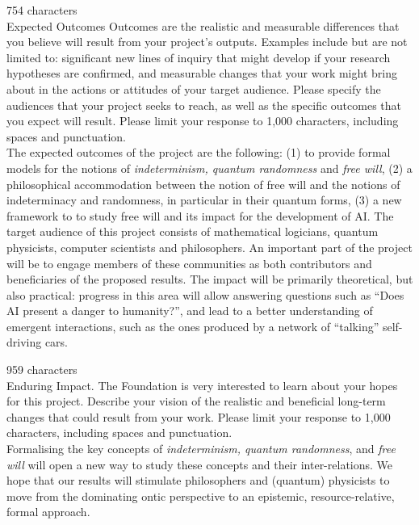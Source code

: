 \documentclass[11pt,  a4paper]{article}
\begin{document}
{\color{red}  754 characters}\\

{\small \color{blue}\noindent  Expected Outcomes Outcomes are the realistic and measurable differences that you believe will result from your project’s outputs. Examples include but are not limited to: significant new lines of inquiry that might develop if your research hypotheses are confirmed, and measurable changes that your work might bring about in the actions or attitudes of your target audience.
Please specify the audiences that your project seeks to reach, as well as the specific outcomes that you expect will result. Please limit your response to 1,000 characters, including spaces and punctuation.}\\


The expected outcomes of the project are the following: (1) to provide  formal models for the notions of {\it indeterminism, quantum randomness} and {\it free will},
(2) a philosophical accommodation
 between the notion of free will and the notions of indeterminacy and randomness, in particular in their quantum forms, (3) a new framework to to study free will and  its impact  for the development of AI. The target audience of this project consists of mathematical logicians, quantum physicists, computer scientists and philosophers. An important part of the project will be to engage members of these communities as both contributors and beneficiaries of the proposed results. The impact will be primarily theoretical, but also practical:  progress in this area will allow   answering  questions such as ``Does AI present a danger to humanity?'',  and lead to a better understanding of emergent interactions, such as the ones  produced by a network of ``talking'' self-driving  cars.




{\color{red} 959  characters}\\

{\small \color{blue}\noindent  Enduring Impact. The Foundation is very interested to learn about your hopes for this project. Describe your vision of the realistic and beneficial long-term changes that could result from your work. Please limit your response to 1,000 characters, including spaces and punctuation.}\\

Formalising the key concepts of {\it indeterminism, quantum randomness},  and {\it free will} will  open a new way to study these concepts and their
inter-relations.  We hope that our results will stimulate philosophers and (quantum) physicists to move from the  dominating ontic perspective  to
an epistemic, resource-relative, formal approach.
\end{document}
